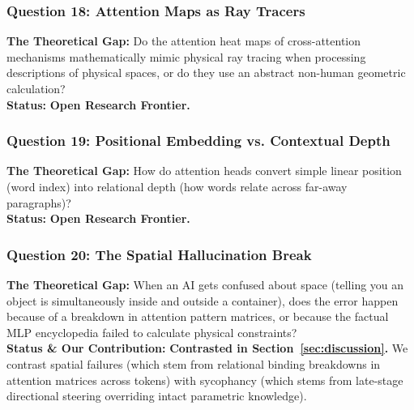 \documentclass[11pt,a4paper]{article}
\begin{document}
\subsubsection{Question 18: Attention Maps as Ray Tracers}
\textbf{The Theoretical Gap:} Do the attention heat maps of cross-attention mechanisms mathematically mimic physical ray tracing when processing descriptions of physical spaces, or do they use an abstract non-human geometric calculation? \\
\textbf{Status:} \textbf{Open Research Frontier.}

\subsubsection{Question 19: Positional Embedding vs. Contextual Depth}
\textbf{The Theoretical Gap:} How do attention heads convert simple linear position (word index) into relational depth (how words relate across far-away paragraphs)? \\
\textbf{Status:} \textbf{Open Research Frontier.}

\subsubsection{Question 20: The Spatial Hallucination Break}
\textbf{The Theoretical Gap:} When an AI gets confused about space (telling you an object is simultaneously inside and outside a container), does the error happen because of a breakdown in attention pattern matrices, or because the factual MLP encyclopedia failed to calculate physical constraints? \\
\textbf{Status \& Our Contribution:} \textbf{Contrasted in Section~\ref{sec:discussion}.} We contrast spatial failures (which stem from relational binding breakdowns in attention matrices across tokens) with sycophancy (which stems from late-stage directional steering overriding intact parametric knowledge).
\end{document}

